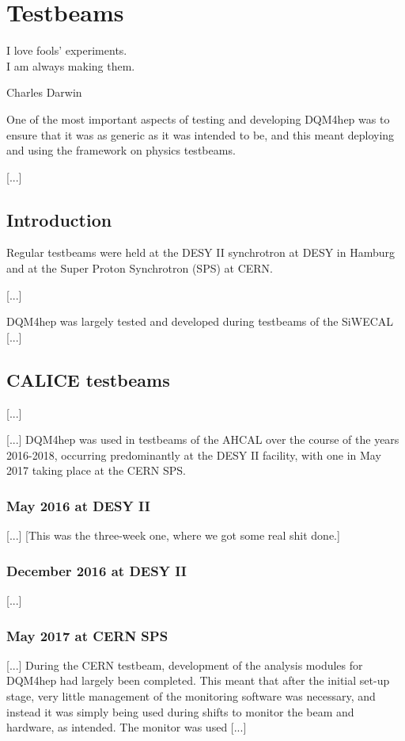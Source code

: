 \chapter{Testbeams}

\epigraph{I love fools' experiments. \\I am always making them.}{Charles Darwin}

One of the most important aspects of testing and developing DQM4hep was to ensure that it was as generic as it was intended to be, and this meant deploying and using the framework on physics testbeams.


[...]

\section{Introduction}

Regular testbeams were held at the DESY II synchrotron at DESY in Hamburg and at the Super Proton Synchrotron (SPS) at CERN. 

[...]

DQM4hep was largely tested and developed during testbeams of the SiWECAL [...]

\section{CALICE testbeams}
[...]

[...] DQM4hep was used in testbeams of the AHCAL over the course of the years 2016-2018, occurring predominantly at the DESY II facility, with one in May 2017 taking place at the CERN SPS.

\subsection{May 2016 at DESY II}
[...] [This was the three-week one, where we got some real shit done.]

\subsection{December 2016 at DESY II}
[...]

\subsection{May 2017 at CERN SPS}
[...] During the CERN testbeam, development of the analysis modules for DQM4hep had largely been completed. This meant that after the initial set-up stage, very little management of the monitoring  software was necessary, and instead it was simply being used during shifts to monitor the beam and hardware, as intended. The monitor was used [...]

